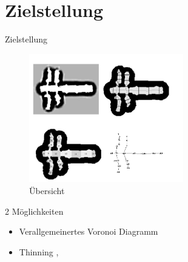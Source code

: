 \section{Zielstellung}
\begin{frame}{Zielstellung}

\begin{figure}[h]
 \centering
 \includegraphics[width=0.6\textwidth]{./material/complete.png}
 \caption{Übersicht \cite{Thrun1998}}
 \label{fig:gesamt}
\end{figure}


\end{frame}

\begin{frame}
 2 Möglichkeiten
 \begin{itemize}
  \item Verallgemeinertes Voronoi Diagramm \cite{Thrun1998}
  \item Thinning \cite{KoBangYun}, \cite{ZhangSuen}
 \end{itemize}

\end{frame}





